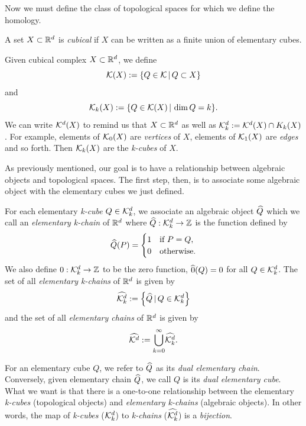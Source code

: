 \noindent {}

Now we must define the class of topological spaces for which we define the homology.

\begin{defn}
	A set $X \subset \mathbb{R}^d$ is \textit{cubical} if $X$ can be written as a finite union of elementary cubes.
\end{defn}

Given cubical complex $X \subset \mathbb{R}^d$, we define
	$$ \mathcal{K}(X) := \{ Q \in \mathcal{K} \, | \, Q \subset X \} $$ and
	$$ \mathcal{K}_k (X) := \{ Q \in \mathcal{K} (X) \, | \, \dim{Q} = k \}. $$
We can write $\mathcal{K}^{d} (X)$ to remind us that $X \subset \mathbb{R}^d$ as well as $\mathcal{K}^{d}_k := \mathcal{K}^{d}(X) \cap K_k(X)$. For example, elements of $\mathcal{K}_0(X)$ are \textit{vertices} of $X$, elements of $\mathcal{K}_1(X)$ are \textit{edges} and so forth. Then $\mathcal{K}_k(X)$ are the \textit{k-cubes} of $X$.

As previously mentioned, our goal is to have a relationship between algebraic objects and topological spaces. The first step, then, is to associate some algebraic object with the elementary cubes we just defined.

\begin{defn}
	For each elementary \textit{k-cube} $Q \in \mathcal{K}^{d}_k$, we associate an algebraic object $\widehat{Q}$ which we call an \textit{elementary k-chain} of $\mathbb{R}^d$ where $\widehat{Q} : \mathcal{K}^{d}_k \rightarrow \mathbb{Z}$ is the function defined by
	$$\widehat{Q}(P) =
		\begin{cases}
			1	& \text{if } P = Q, \\
			0	& \text{otherwise.}
		\end{cases}$$
	We also define $0 : \mathcal{K}^{d}_k \rightarrow \mathbb{Z}$ to be the zero function, \ie $\widehat{0}(Q) = 0$ for all $Q \in \mathcal{K}^{d}_k$.
	The set of all \textit{elementary k-chains} of $\mathbb{R}^d$ is given by
	$$ \widehat{\mathcal{K}^{d}_k} := \left\{ \widehat{Q} \, | \, Q \in \mathcal{K}^{d}_k \right\} $$ and the set of all \textit{elementary chains} of $\mathbb{R}^d$ is given by
	$$ \widehat{\mathcal{K}^{d}} := { \bigcup_{k=0}^{\infty} } \widehat{\mathcal{K}^{d}_k} . $$
\end{defn}

For an elementary cube $Q$, we refer to $\widehat{Q}$ as its \textit{dual elementary chain}. Conversely, given elementary chain $\widehat{Q}$, we call $Q$ is its \textit{dual elementary cube}. What we want is that there is a one-to-one relationship between the elementary \textit{k-cubes} (topological objects) and \textit{elementary k-chains} (algebraic objects). In other words, the map of \textit{k-cubes} ($\mathcal{K}^{d}_k$) to \textit{k-chains} ($\widehat{\mathcal{K}^{d}_k}$) is a \textit{bijection}. 

